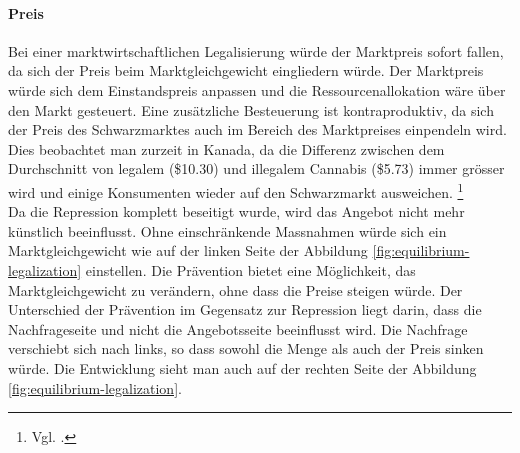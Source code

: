 \documentclass[../main.tex]{subfiles}
\begin{document}
	 \paragraph{Preis}
	 Bei einer marktwirtschaftlichen Legalisierung würde der Marktpreis sofort fallen, da sich der Preis beim Marktgleichgewicht eingliedern würde. 
	 Der Marktpreis würde sich dem Einstandspreis anpassen und die Ressourcenallokation wäre über den Markt gesteuert.
	 Eine zusätzliche Besteuerung ist kontraproduktiv, da sich der Preis des Schwarzmarktes auch im Bereich des Marktpreises einpendeln wird.
	 Dies beobachtet man zurzeit in Kanada, da die Differenz zwischen dem Durchschnitt von legalem (\$10.30) und illegalem Cannabis (\$5.73) immer grösser wird und einige Konsumenten wieder auf den Schwarzmarkt ausweichen.%
	 \footnote{Vgl. \cite{cbc-01}.}\\
	 
	 \noindent
	 Da die Repression komplett beseitigt wurde, wird das Angebot nicht mehr künstlich beeinflusst.
	 Ohne einschränkende Massnahmen würde sich ein Marktgleichgewicht wie auf der linken Seite der Abbildung \ref{fig:equilibrium-legalization} einstellen.
	 Die Prävention bietet eine Möglichkeit, das Marktgleichgewicht zu verändern, ohne dass die Preise steigen würde.
	 Der Unterschied der Prävention im Gegensatz zur Repression liegt darin, dass die Nachfrageseite und nicht die Angebotsseite beeinflusst wird.
	 Die Nachfrage verschiebt sich nach links, so dass sowohl die Menge als auch der Preis sinken würde.
	 Die Entwicklung sieht man auch auf der rechten Seite der Abbildung \ref{fig:equilibrium-legalization}.
	 
\end{document}
